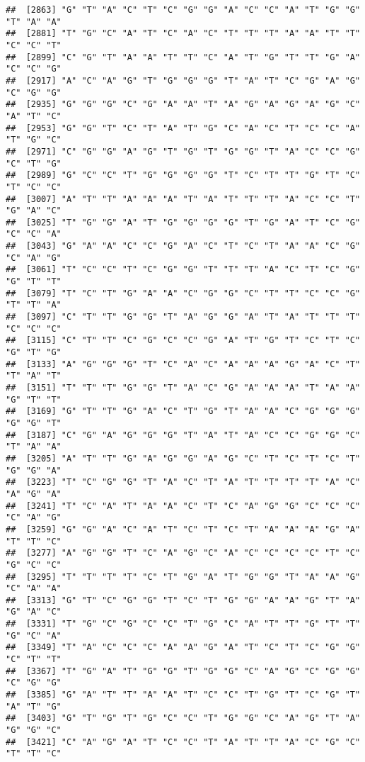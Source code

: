 \documentclass[
]{article}
\begin{document}
\begin{verbatim}
##  [2863] "G" "T" "A" "C" "T" "C" "G" "G" "A" "C" "C" "A" "T" "G" "G" "T" "A" "A"
##  [2881] "T" "G" "C" "A" "T" "C" "A" "C" "T" "T" "T" "A" "A" "T" "T" "C" "C" "T"
##  [2899] "C" "G" "T" "A" "A" "T" "T" "C" "A" "T" "G" "T" "T" "G" "A" "C" "C" "G"
##  [2917] "A" "C" "A" "G" "T" "G" "G" "G" "T" "A" "T" "C" "G" "A" "G" "C" "G" "G"
##  [2935] "G" "G" "G" "C" "G" "A" "A" "T" "A" "G" "A" "G" "A" "G" "C" "A" "T" "C"
##  [2953] "G" "G" "T" "C" "T" "A" "T" "G" "C" "A" "C" "T" "C" "C" "A" "T" "G" "C"
##  [2971] "C" "G" "G" "A" "G" "T" "G" "T" "G" "G" "T" "A" "C" "C" "G" "C" "T" "G"
##  [2989] "G" "C" "C" "T" "G" "G" "G" "G" "T" "C" "T" "T" "G" "T" "C" "T" "C" "C"
##  [3007] "A" "T" "T" "A" "A" "A" "T" "A" "T" "T" "T" "A" "C" "C" "T" "G" "A" "C"
##  [3025] "T" "G" "G" "A" "T" "G" "G" "G" "G" "T" "G" "A" "T" "C" "G" "C" "C" "A"
##  [3043] "G" "A" "A" "C" "C" "G" "A" "C" "T" "C" "T" "A" "A" "C" "G" "C" "A" "G"
##  [3061] "T" "C" "C" "T" "C" "G" "G" "T" "T" "T" "A" "C" "T" "C" "G" "G" "T" "T"
##  [3079] "T" "C" "T" "G" "A" "A" "C" "G" "G" "C" "T" "T" "C" "C" "G" "T" "T" "A"
##  [3097] "C" "T" "T" "G" "G" "T" "A" "G" "G" "A" "T" "A" "T" "T" "T" "C" "C" "C"
##  [3115] "C" "T" "T" "C" "G" "C" "C" "G" "A" "T" "G" "T" "C" "T" "C" "G" "T" "G"
##  [3133] "A" "G" "G" "G" "T" "C" "A" "C" "A" "A" "A" "G" "A" "C" "T" "T" "A" "T"
##  [3151] "T" "T" "T" "G" "G" "T" "A" "C" "G" "A" "A" "A" "T" "A" "A" "G" "T" "T"
##  [3169] "G" "T" "T" "G" "A" "C" "T" "G" "T" "A" "A" "C" "G" "G" "G" "G" "G" "T"
##  [3187] "C" "G" "A" "G" "G" "G" "T" "A" "T" "A" "C" "C" "G" "G" "C" "T" "A" "A"
##  [3205] "A" "T" "T" "G" "A" "G" "G" "A" "G" "C" "T" "C" "T" "C" "T" "G" "G" "A"
##  [3223] "T" "C" "G" "G" "T" "A" "C" "T" "A" "T" "T" "T" "T" "A" "C" "A" "G" "A"
##  [3241] "T" "C" "A" "T" "A" "A" "C" "T" "C" "A" "G" "G" "C" "C" "C" "C" "A" "G"
##  [3259] "G" "G" "A" "C" "A" "T" "C" "T" "C" "T" "A" "A" "A" "G" "A" "T" "T" "C"
##  [3277] "A" "G" "G" "T" "C" "A" "G" "C" "A" "C" "C" "C" "C" "T" "C" "G" "C" "C"
##  [3295] "T" "T" "T" "T" "C" "T" "G" "A" "T" "G" "G" "T" "A" "A" "G" "C" "A" "A"
##  [3313] "G" "T" "C" "G" "G" "T" "C" "T" "G" "G" "A" "A" "G" "T" "A" "G" "A" "C"
##  [3331] "T" "G" "C" "G" "C" "C" "T" "G" "C" "A" "T" "T" "G" "T" "T" "G" "C" "A"
##  [3349] "T" "A" "C" "C" "C" "A" "A" "G" "A" "T" "C" "T" "C" "G" "G" "C" "T" "T"
##  [3367] "T" "G" "A" "T" "G" "G" "T" "G" "G" "C" "A" "G" "C" "G" "G" "C" "G" "G"
##  [3385] "G" "A" "T" "T" "A" "A" "T" "C" "C" "T" "G" "T" "C" "G" "T" "A" "T" "G"
##  [3403] "G" "T" "G" "T" "G" "C" "C" "T" "G" "G" "C" "A" "G" "T" "A" "G" "G" "C"
##  [3421] "C" "A" "G" "A" "T" "C" "C" "T" "A" "T" "T" "A" "C" "G" "C" "T" "T" "C"

\end{verbatim}
\end{document}
